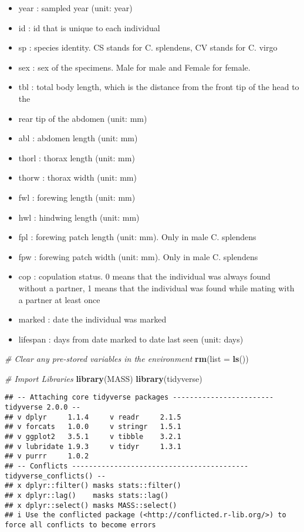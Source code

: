 \documentclass[
]{article}
\newenvironment{Shaded}{\begin{snugshade}}{\end{snugshade}}
\newcommand{\AttributeTok}[1]{\textcolor[rgb]{0.13,0.29,0.53}{#1}}
\newcommand{\CommentTok}[1]{\textcolor[rgb]{0.56,0.35,0.01}{\textit{#1}}}
\newcommand{\FunctionTok}[1]{\textcolor[rgb]{0.13,0.29,0.53}{\textbf{#1}}}
\newcommand{\NormalTok}[1]{#1}
\providecommand{\tightlist}{%
  \setlength{\itemsep}{0pt}\setlength{\parskip}{0pt}}
\begin{document}
\begin{itemize}
\tightlist
\item
  year : sampled year (unit: year)
\item
  id : id that is unique to each individual
\item
  sp : species identity. CS stands for C. splendens, CV stands for C.
  virgo
\item
  sex : sex of the specimens. Male for male and Female for female.
\item
  tbl : total body length, which is the distance from the front tip of
  the head to the
\item
  rear tip of the abdomen (unit: mm)
\item
  abl : abdomen length (unit: mm)
\item
  thorl : thorax length (unit: mm)
\item
  thorw : thorax width (unit: mm)
\item
  fwl : forewing length (unit: mm)
\item
  hwl : hindwing length (unit: mm)
\item
  fpl : forewing patch length (unit: mm). Only in male C. splendens
\item
  fpw : forewing patch width (unit: mm). Only in male C. splendens
\item
  cop : copulation status. 0 means that the individual was always found
  without a partner, 1 means that the individual was found while mating
  with a partner at least once
\item
  marked : date the individual was marked
\item
  lifespan : days from date marked to date last seen (unit: days)
\end{itemize}

\begin{Shaded}
\begin{Highlighting}[]
\CommentTok{\# Clear any pre{-}stored variables in the environment}
\FunctionTok{rm}\NormalTok{(}\AttributeTok{list =} \FunctionTok{ls}\NormalTok{())}

\CommentTok{\# Import Libraries}
\FunctionTok{library}\NormalTok{(MASS)}
\FunctionTok{library}\NormalTok{(tidyverse)}
\end{Highlighting}
\end{Shaded}

\begin{verbatim}
## -- Attaching core tidyverse packages ------------------------ tidyverse 2.0.0 --
## v dplyr     1.1.4     v readr     2.1.5
## v forcats   1.0.0     v stringr   1.5.1
## v ggplot2   3.5.1     v tibble    3.2.1
## v lubridate 1.9.3     v tidyr     1.3.1
## v purrr     1.0.2     
## -- Conflicts ------------------------------------------ tidyverse_conflicts() --
## x dplyr::filter() masks stats::filter()
## x dplyr::lag()    masks stats::lag()
## x dplyr::select() masks MASS::select()
## i Use the conflicted package (<http://conflicted.r-lib.org/>) to force all conflicts to become errors
\end{verbatim}
\end{document}
